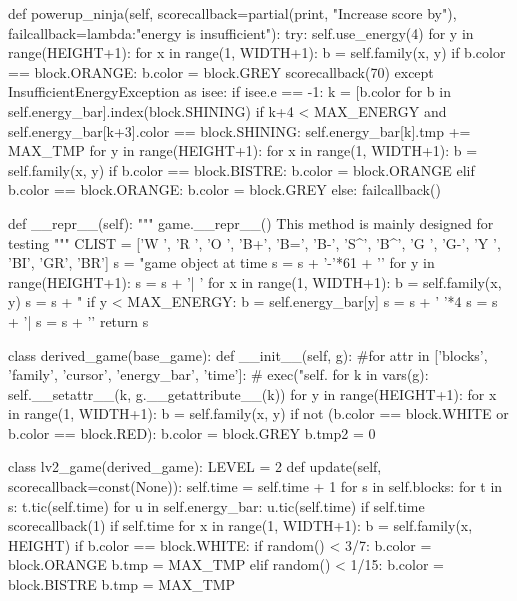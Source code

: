 \documentclass[UTF8]{article}
\begin{document}
\begin{python}
    def powerup_ninja(self, scorecallback=partial(print, "Increase score by"), failcallback=lambda:"energy is insufficient"):
        try:
            self.use_energy(4)
            for y in range(HEIGHT+1):
                for x in range(1, WIDTH+1):
                    b = self.family(x, y)
                    if b.color == block.ORANGE:
                        b.color = block.GREY
            scorecallback(70)
        except InsufficientEnergyException as isee:
            if isee.e == -1:
                k = [b.color for b in self.energy_bar].index(block.SHINING)
                if k+4 < MAX_ENERGY and self.energy_bar[k+3].color == block.SHINING:
                    self.energy_bar[k].tmp += MAX_TMP
                    for y in range(HEIGHT+1):
                        for x in range(1, WIDTH+1):
                            b = self.family(x, y)
                            if b.color == block.BISTRE:
                                b.color = block.ORANGE
                            elif b.color == block.ORANGE:
                                b.color = block.GREY
            else:
                failcallback()
        
    def __repr__(self):
        """
        game.__repr__()
        This method is mainly designed for testing
        """
        CLIST = ['W ', 'R ', 'O ', 'B+', 'B=', 'B-', 'S^', 'B^', 'G ', 'G-',
                 'Y ', 'BI', 'GR', 'BR']
        s = "game object at time %
        s = s + '-'*61 + '\n'
        for y in range(HEIGHT+1):
            s = s + '| '
            for x in range(1, WIDTH+1):
                b = self.family(x, y)
                s = s + "%
            if y < MAX_ENERGY:
                b = self.energy_bar[y]
                s = s + ' '*4
                s = s + '|%
            s = s + '\n'
        return s

class derived_game(base_game):
    def __init__(self, g):
        #for attr in ['blocks', 'family', 'cursor', 'energy_bar', 'time']:
        #    exec("self.%
        for k in vars(g):
            self.__setattr__(k, g.__getattribute__(k))
        for y in range(HEIGHT+1):
            for x in range(1, WIDTH+1):
                b = self.family(x, y)
                if not (b.color == block.WHITE or b.color == block.RED):
                    b.color = block.GREY
                    b.tmp2 = 0

class lv2_game(derived_game):
    LEVEL = 2    
    def update(self, scorecallback=const(None)):
        self.time = self.time + 1
        for s in self.blocks:
            for t in s:
                t.tic(self.time)
        for u in self.energy_bar:
            u.tic(self.time)
        if self.time %
            scorecallback(1)
        if self.time %
            for x in range(1, WIDTH+1):
                b = self.family(x, HEIGHT)
                if b.color == block.WHITE:
                    if random() < 3/7:
                        b.color = block.ORANGE
                        b.tmp = MAX_TMP
                    elif random() < 1/15:
                        b.color = block.BISTRE
                        b.tmp = MAX_TMP


\end{python}
\end{document}
